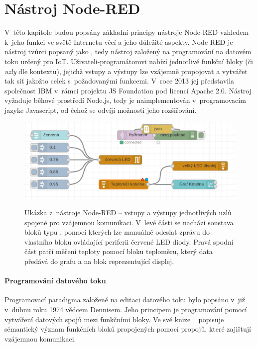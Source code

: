 \chapter{Nástroj Node-RED}
\label{ch:nastroj-node-red}

V~této kapitole budou popsány základní principy nástroje Node-RED vzhledem k~jeho funkci ve světě Internetu věcí a
jeho důležité aspekty.
Node-RED je nástroj tvůrci popsaný jako , tedy nástroj založený na
programování na datovém toku určený pro IoT. Uživateli-programátorovi nabízí jednotlivé funkční bloky (či \emph{uzly}
dle kontextu),
jejichž vstupy a výstupy lze vzájemně propojovat a vytvářet tak síť jakožto celek s~požadovanými funkcemi.
V~roce 2013 jej představila společnost IBM v~rámci projektu JS Foundation pod licencí Apache 2.0. Nástroj vyžaduje
běhové prostředí Node.js, tedy je naimplementován v~programovacím jazyke Javascript, od čehož se odvíjí možnosti
jeho rozšiřování.

\begin{figure}
    \includegraphics[width=\textwidth]{figures/node-red-example.png}
    \label{fig:node-red-example}
    \caption{Ukázka z~nástroje Node-RED -- vstupy a výstupy jednotlivých uzlů spojené pro vzájemnou komunikaci.
    V~levé části se nachází soustava bloků typu , pomocí kterých lze manuálně odeslat zprávu do vlastního
    bloku ovládající periferii červené LED diody.
    Pravá spodní část patří měření teploty pomocí bloku teploměru, který data předává do grafu a na blok
    reprezentující displej.}
\end{figure}

\subsubsection{Programování datového toku}
Programovací paradigma založené na editaci datového toku bylo popsáno v~již v~dubnu roku 1974 vědcem Dennisem. Jeho
principem je programování pomocí vytváření datových spojů mezi funkčními bloky.
Ve své knize ~\cite{FirstVersionOfDataflow} popisuje sémantický
význam funkčních bloků propojených pomocí propojů, které zajištují vzájemnou komunikaci.

